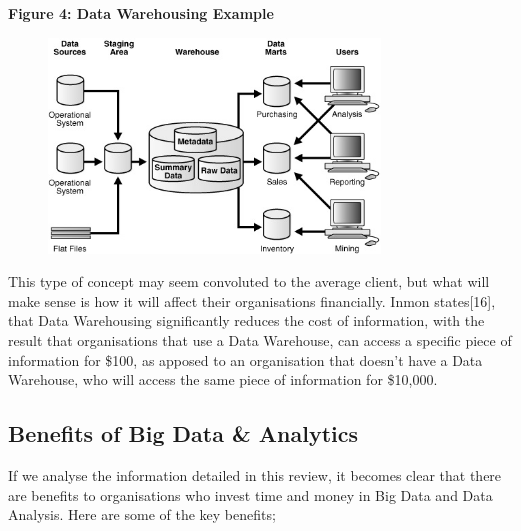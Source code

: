 \documentclass[10pt,journal,compsoc]{IEEEtran}
\begin{document}
\textbf{Figure 4: Data Warehousing Example}
\begin{figure}[ht!]
	\centering
	\includegraphics[width=88mm]{dwarehouse.jpg}
\end{figure}

This type of concept may seem convoluted to the average client, but what will make sense is how it will affect their organisations financially. Inmon states[16], that Data Warehousing significantly reduces the cost of information, with the result that organisations that use a Data Warehouse, can access a specific piece of information for \$100, as apposed to an organisation that doesn't have a Data Warehouse, who will access the same piece of information for \$10,000. 

\subsection{Benefits of Big Data \& Analytics}
If we analyse the information detailed in this review, it becomes clear that there are benefits to organisations who invest time and money in Big Data and Data Analysis. Here are some of the key benefits;
\end{document}
